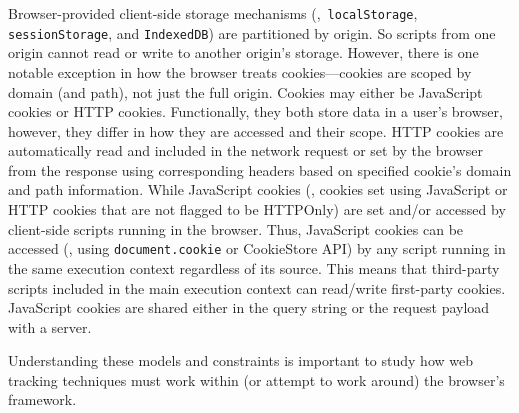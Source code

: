 %
Browser-provided client-side storage mechanisms (\eg{},~\texttt{localStorage}, \texttt{sessionStorage}, and \texttt{IndexedDB}) are partitioned by origin.
%
So scripts from one origin cannot read or write to another origin’s storage. 
%
However, there is one notable exception in how the browser treats cookies---cookies are scoped by domain (and path), not just the full origin. 
%
%
%
Cookies may either be JavaScript cookies or HTTP cookies. 
%
Functionally, they both store data in a user's browser, however, they differ in how they are accessed and their scope.
%
HTTP cookies are automatically read and included in the network request or set by the browser from the response using corresponding headers based on specified cookie's domain and path information.
%
While JavaScript cookies (\ie{}, cookies set using JavaScript or HTTP cookies that are not flagged to be HTTPOnly) are set and/or accessed by client-side scripts running in the browser. 
%
Thus, JavaScript cookies can be accessed (\eg{}, using \texttt{document.cookie} or CookieStore API) by any script running in the same execution context regardless of its source. 
%
This means that third-party scripts included in the main execution context can read/write first-party cookies. 
%
JavaScript cookies are shared either in the query string or the request payload with a server.
%


Understanding these models and constraints is important to study how web tracking techniques must work within (or attempt to work around) the browser’s framework.